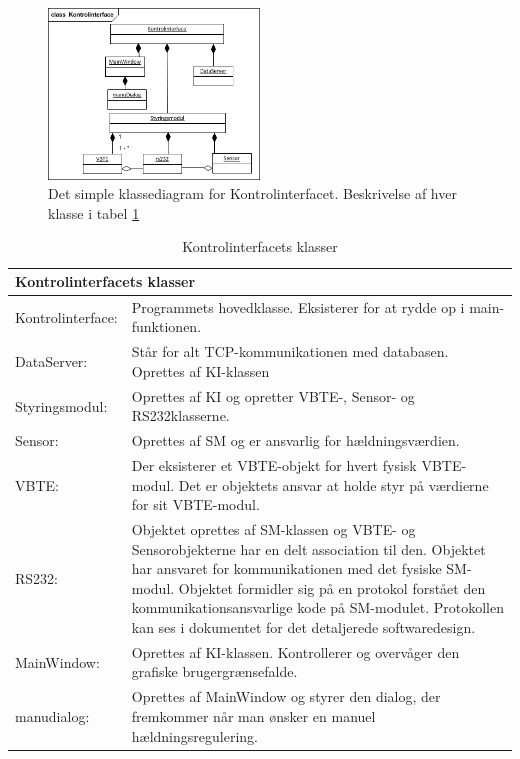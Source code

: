 \begin{figure}[htbp]
\centering
\includegraphics[width=0.5\textwidth]{billeder/KI/klassediagram_simpel}
\caption{Det simple klassediagram for Kontrolinterfacet. Beskrivelse af hver klasse i tabel \ref{tabel:ki-klasser}}
\label{fig:kd_simpel}
\end{figure}
 
\begin{table}[H]
\centering
{}
\begin{tabular}{| p{3cm}  p{12.5cm}|}
\multicolumn{2}{l}{{\Large Kontrolinterfacets klasser}} \\\hline
Kontrolinterface:&Programmets hovedklasse. Eksisterer for at rydde op i main-funktionen.\\\hline
DataServer:&Står for alt TCP-kommunikationen med databasen. Oprettes af KI-klassen\\\hline
Styringsmodul:&Oprettes af KI og opretter VBTE-, Sensor- og RS232klasserne.\\\hline
Sensor:&Oprettes af SM og er ansvarlig for hældningsværdien.\\\hline
VBTE:&Der eksisterer et VBTE-objekt for hvert fysisk VBTE-modul. Det er objektets ansvar at holde styr på værdierne for sit VBTE-modul.\\\hline
RS232:&Objektet oprettes af SM-klassen og VBTE- og Sensorobjekterne har en delt association til den. Objektet har ansvaret for kommunikationen med det fysiske SM-modul. Objektet formidler sig på en protokol forstået den kommunikationsansvarlige kode på SM-modulet. Protokollen kan ses i dokumentet for det detaljerede softwaredesign.\\\hline
MainWindow:&Oprettes af KI-klassen. Kontrollerer og overvåger den grafiske brugergrænsefalde.\\\hline
manudialog:&Oprettes af MainWindow og styrer den dialog, der fremkommer når man ønsker en manuel hældningsregulering.\\\hline
\end{tabular}
\caption{Kontrolinterfacets klasser}
\label{tabel:ki-klasser}
\end{table}

